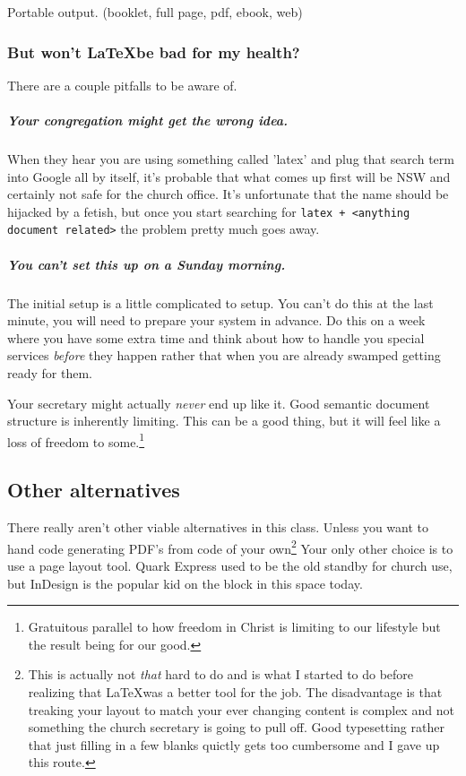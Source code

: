 \documentclass[12pt]{scrartcl}
\begin{document}
Portable output. (booklet, full page, pdf, ebook, web)

\subsubsection{But won't \LaTeX be bad for my health?}

There are a couple pitfalls to be aware of.


\subparagraph{Your congregation might get the wrong idea.}

When they hear you are using something called 'latex' and plug that search term into Google all by itself, it's probable that what comes up first will be NSW and certainly not safe for the church office. It's unfortunate that the name should be hijacked by a fetish, but once you start searching for \texttt{latex + <anything document related>} the problem pretty much goes away.


\subparagraph{You can't set this up on a Sunday morning.}

The initial setup is a little complicated to setup. You can't do this at the last minute, you will need to prepare your system in advance. Do this on a week where you have some extra time and think about how to handle you special services \emph{before} they happen rather that when you are already swamped getting ready for them.

Your secretary might actually \emph{never} end up like it. Good semantic document structure is inherently limiting. This can be a good thing, but it will feel like a loss of freedom to some.\footnote{Gratuitous parallel to how freedom in Christ is limiting to our lifestyle but the result being for our good.}

\subsection{Other alternatives}

There really aren't other viable alternatives in this class. Unless you want to hand code generating PDF's from code of your own\footnote{This is actually not \emph{that} hard to do and is what I started to do before realizing that \LaTeX was a better tool for the job. The disadvantage is that treaking your layout to match your ever changing content is complex and not something the church secretary is going to pull off. Good typesetting rather that just filling in a few blanks quictly gets too cumbersome and I gave up this route.} Your only other choice is to use a page layout tool. Quark Express used to be the old standby for church use, but InDesign is the popular kid on the block in this space today.
\end{document}
